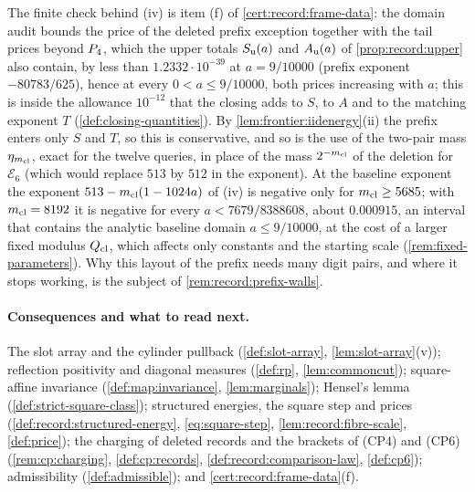 \begin{remark}\label{rem:prefix-digits}
The finite check behind (iv) is item (f) of \cref{cert:record:frame-data}: the
domain audit 
bounds the price of the deleted prefix exception together with the tail prices
beyond $P_4$, which the upper totals $S_{\rm u}(a)$ and $A_{\rm u}(a)$ of
\cref{prop:record:upper} also contain, by less
than $1.2332\cdot10^{-39}$ at $a=9/10000$ (prefix exponent $-80783/625$), hence
at every $0<a\le9/10000$, both prices increasing with $a$; this is inside the
allowance $10^{-12}$ that the closing adds to $S$, to $A$ and to the matching
exponent $T$ (\cref{def:closing-quantities}). By
\cref{lem:frontier:iidenergy}(ii) the prefix enters only
$S$ and $T$, so this is conservative, and so is the use of the two-pair mass
$\eta_{m_{\mathrm{cl}}}$, exact for the twelve queries, in place of the mass $2^{-m_{\mathrm{cl}}}$
of the deletion for $\mathcal E_6$ (which would replace $513$ by $512$ in the
exponent). At the baseline exponent the exponent $513-m_{\mathrm{cl}}(1-1024a)$ of (iv) is
negative only for $m_{\mathrm{cl}}\ge5685$; with $m_{\mathrm{cl}}=8192$ it is negative for every
$a<7679/8388608$, about $0.000915$, an interval that contains the analytic
baseline domain $a\le9/10000$, at the cost of a larger fixed modulus $Q_{\rm cl}$, which
affects only constants and the starting scale (\cref{rem:fixed-parameters}).
Why this layout of the prefix needs many digit pairs, and where it stops
working, is the subject of \cref{rem:record:prefix-walls}.
\end{remark}

\paragraph{Consequences and what to read next.}
The slot array and the cylinder pullback (\cref{def:slot-array},
\cref{lem:slot-array}(v)); reflection positivity and diagonal measures
(\cref{def:rp}, \cref{lem:commoncut}); square-affine invariance
(\cref{def:map:invariance}, \cref{lem:marginals}); Hensel's lemma
(\cref{def:strict-square-class}); structured energies, the square step and
prices (\cref{def:record:structured-energy}, \eqref{eq:square-step},
\cref{lem:record:fibre-scale}, \cref{def:price}); the charging of deleted records
and the brackets of (CP4) and (CP6) (\cref{rem:cp:charging}, \cref{def:cp:records},
\cref{def:record:comparison-law}, \cref{def:cp6}); admissibility
(\cref{def:admissible}); and \cref{cert:record:frame-data}(f).

